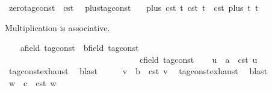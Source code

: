 \begin{isabellebody}
\isanewline
{}\isamarkupfalse%
\ {\isacartoucheopen}zero{\isacharunderscore}tag{\isacharunderscore}const\ {\isasymequiv}\ {\isasymtau}\isactrlsub c\isactrlsub s\isactrlsub t\ {}{\isacartoucheclose}\isanewline
\isanewline
{}\isamarkupfalse%
\ plus{\isacharunderscore}tag{\isacharunderscore}const\isanewline
\ \ \ {\isacartoucheopen}plus\ {\isacharparenleft}{\isasymtau}\isactrlsub c\isactrlsub s\isactrlsub t\ t\ {\isacharparenleft}{\isasymtau}\isactrlsub c\isactrlsub s\isactrlsub t\ t\ {\isacharequal}\ {\isasymtau}\isactrlsub c\isactrlsub s\isactrlsub t\ {\isacharparenleft}plus\ t\ t\isanewline
\isanewline
{}\isamarkupfalse%
%
\isadelimproof
\ %
\endisadelimproof
%
\isatagproof
{}\isamarkupfalse%
%
\begin{isamarkuptext}%
Multiplication is associative.%
\end{isamarkuptext}\isamarkuptrue%
\ \ \isamarkupfalse%
\ a{\isacharcolon}{\isacharcolon}{\isacartoucheopen}{\isacharprime}{\isasymtau}{\isacharcolon}{\isacharcolon}field\ tag{\isacharunderscore}const{\isacartoucheclose}\ \ b{\isacharcolon}{\isacharcolon}{\isacartoucheopen}{\isacharprime}{\isasymtau}{\isacharcolon}{\isacharcolon}field\ tag{\isacharunderscore}const{\isacartoucheclose}\isanewline
\ \ \ \ \ \ \ \ \ \ \ \ \ \ \ \ \ \ \ \ \ \ \ \ \ \ \ \ \ \ \ \ c{\isacharcolon}{\isacharcolon}{\isacartoucheopen}{\isacharprime}{\isasymtau}{\isacharcolon}{\isacharcolon}field\ tag{\isacharunderscore}const{\isacartoucheclose}\isanewline
\ \ \isamarkupfalse%
\ u\ \ {\isacartoucheopen}a\ {\isacharequal}\ {\isasymtau}\isactrlsub c\isactrlsub s\isactrlsub t\ u{\isacartoucheclose}\ \isamarkupfalse%
\ tag{\isacharunderscore}const{\isachardot}exhaust\ \isamarkupfalse%
\ blast\isanewline
\ \ \isamarkupfalse%
\ \isamarkupfalse%
\ v\ \ {\isacartoucheopen}b\ {\isacharequal}\ {\isasymtau}\isactrlsub c\isactrlsub s\isactrlsub t\ v{\isacartoucheclose}\ \isamarkupfalse%
\ tag{\isacharunderscore}const{\isachardot}exhaust\ \isamarkupfalse%
\ blast\isanewline
\ \ \isamarkupfalse%
\ \isamarkupfalse%
\ w\ \ {\isacartoucheopen}c\ {\isacharequal}\ {\isasymtau}\isactrlsub c\isactrlsub s\isactrlsub t\ w{\isacartoucheclose}\ \isamarkupfalse%

\end{isabellebody}
